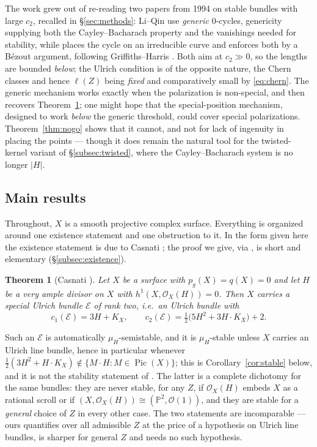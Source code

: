 \documentclass[10pt,a4paper]{amsart}
\newtheorem{theorem}{Theorem}[section]
\newcommand{\OO}{\mathcal{O}}
\newcommand{\EE}{\mathcal{E}}
\newcommand{\PP}{\mathbb{P}}
\newcommand{\Pic}{\operatorname{Pic}}
\newcommand{\len}{\ell}
\begin{document}
The work grew out of re-reading two papers from 1994 on stable bundles with large $c_2$, recalled in \S\ref{sec:methods}: Li--Qin \cite{LQ94} use \emph{generic} $0$-cycles, genericity supplying both the Cayley--Bacharach property and the vanishings needed for stability, while \cite{An94} places the cycle on an irreducible curve and enforces both by a B\'ezout argument, following Griffiths--Harris \cite{GH78}. Both aim at $c_2\gg0$, so the lengths are bounded \emph{below}; the Ulrich condition is of the opposite nature, the Chern classes and hence $\len(Z)$ being \emph{fixed} and comparatively small by \eqref{eq:chern}. The generic mechanism works exactly when the polarization is non-special, and then recovers Theorem~\ref{thm:main}; one might hope that the special-position mechanism, designed to work \emph{below} the generic threshold, could cover special polarizations. Theorem~\ref{thm:nogo} shows that it cannot, and not for lack of ingenuity in placing the points --- though it does remain the natural tool for the twisted-kernel variant of \S\ref{subsec:twisted}, where the Cayley--Bacharach system is no longer $|H|$.

\subsection{Main results}\label{subsec:mainresults}
Throughout, $X$ is a smooth projective complex surface. Everything is organized around one existence statement and one obstruction to it. In the form given here the existence statement is due to Casnati \cite{Cas17}; the proof we give, via \cite{LQ94}, is short and elementary (\S\ref{subsec:existence}).

\begin{theorem}[Casnati {\cite[Thm.~1.1]{Cas17}}]\label{thm:main}
Let $X$ be a surface with $p_g(X)=q(X)=0$ and let $H$ be a very ample divisor on $X$ with $h^1(X,\OO_X(H))=0$. Then $X$ carries a special Ulrich bundle $\EE$ of rank two, i.e.\ an Ulrich bundle with
\[
c_1(\EE)=3H+K_X,\qquad c_2(\EE)=\tfrac12\bigl(5H^2+3H\cdot K_X\bigr)+2 .
\]
\end{theorem}

Such an $\EE$ is automatically $\mu_H$-semistable, and it is $\mu_H$-stable unless $X$ carries an Ulrich line bundle, hence in particular whenever $\tfrac12(3H^2+H\cdot K_X)\notin\{M\cdot H:M\in\Pic(X)\}$; this is Corollary~\ref{cor:stable} below, and it is not the stability statement of \cite[Thm.~1.2]{Cas17}. The latter is a complete dichotomy for the same bundles: they are never stable, for any $Z$, if $\OO_X(H)$ embeds $X$ as a rational scroll or if $(X,\OO_X(H))\cong(\PP^2,\OO(1))$, and they are stable for a \emph{general} choice of $Z$ in every other case. The two statements are incomparable --- ours quantifies over all admissible $Z$ at the price of a hypothesis on Ulrich line bundles, \cite[Thm.~1.2]{Cas17} is sharper for general $Z$ and needs no such hypothesis.
\end{document}
